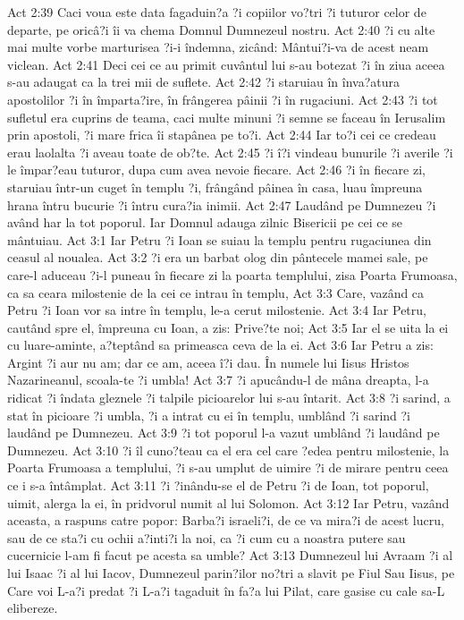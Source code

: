 Act 2:39  Caci voua este data fagaduin?a ?i copiilor vo?tri ?i tuturor celor de departe, pe oricâ?i îi va chema Domnul Dumnezeul nostru.
Act 2:40  ?i cu alte mai multe vorbe marturisea ?i-i îndemna, zicând: Mântui?i-va de acest neam viclean.
Act 2:41  Deci cei ce au primit cuvântul lui s-au botezat ?i în ziua aceea s-au adaugat ca la trei mii de suflete.
Act 2:42  ?i staruiau în înva?atura apostolilor ?i în împarta?ire, în frângerea pâinii ?i în rugaciuni.
Act 2:43  ?i tot sufletul era cuprins de teama, caci multe minuni ?i semne se faceau în Ierusalim prin apostoli, ?i mare frica îi stapânea pe to?i.
Act 2:44  Iar to?i cei ce credeau erau laolalta ?i aveau toate de ob?te.
Act 2:45  ?i î?i vindeau bunurile ?i averile ?i le împar?eau tuturor, dupa cum avea nevoie fiecare.
Act 2:46  ?i în fiecare zi, staruiau într-un cuget în templu ?i, frângând pâinea în casa, luau împreuna hrana întru bucurie ?i întru cura?ia inimii.
Act 2:47  Laudând pe Dumnezeu ?i având har la tot poporul. Iar Domnul adauga zilnic Bisericii pe cei ce se mântuiau.
Act 3:1  Iar Petru ?i Ioan se suiau la templu pentru rugaciunea din ceasul al noualea.
Act 3:2  ?i era un barbat olog din pântecele mamei sale, pe care-l aduceau ?i-l puneau în fiecare zi la poarta templului, zisa Poarta Frumoasa, ca sa ceara milostenie de la cei ce intrau în templu,
Act 3:3  Care, vazând ca Petru ?i Ioan vor sa intre în templu, le-a cerut milostenie.
Act 3:4  Iar Petru, cautând spre el, împreuna cu Ioan, a zis: Prive?te noi;
Act 3:5  Iar el se uita la ei cu luare-aminte, a?teptând sa primeasca ceva de la ei.
Act 3:6  Iar Petru a zis: Argint ?i aur nu am; dar ce am, aceea î?i dau. În numele lui Iisus Hristos Nazarineanul, scoala-te ?i umbla!
Act 3:7  ?i apucându-l de mâna dreapta, l-a ridicat ?i îndata gleznele ?i talpile picioarelor lui s-au întarit.
Act 3:8  ?i sarind, a stat în picioare ?i umbla, ?i a intrat cu ei în templu, umblând ?i sarind ?i laudând pe Dumnezeu.
Act 3:9  ?i tot poporul l-a vazut umblând ?i laudând pe Dumnezeu.
Act 3:10  ?i îl cuno?teau ca el era cel care ?edea pentru milostenie, la Poarta Frumoasa a templului, ?i s-au umplut de uimire ?i de mirare pentru ceea ce i s-a întâmplat.
Act 3:11  ?i ?inându-se el de Petru ?i de Ioan, tot poporul, uimit, alerga la ei, în pridvorul numit al lui Solomon.
Act 3:12  Iar Petru, vazând aceasta, a raspuns catre popor: Barba?i israeli?i, de ce va mira?i de acest lucru, sau de ce sta?i cu ochii a?inti?i la noi, ca ?i cum cu a noastra putere sau cucernicie l-am fi facut pe acesta sa umble?
Act 3:13  Dumnezeul lui Avraam ?i al lui Isaac ?i al lui Iacov, Dumnezeul parin?ilor no?tri a slavit pe Fiul Sau Iisus, pe Care voi L-a?i predat ?i L-a?i tagaduit în fa?a lui Pilat, care gasise cu cale sa-L elibereze.
